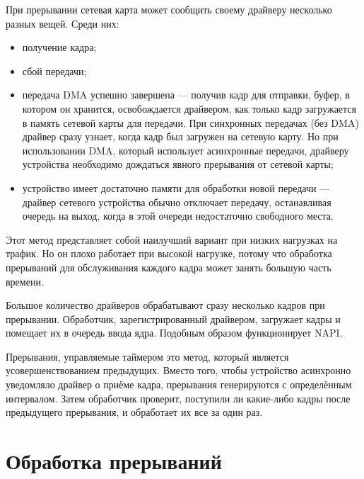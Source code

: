 При прерывании сетевая карта может сообщить своему драйверу несколько разных вещей. Среди них:
\begin{itemize}[label=---]
	\item получение кадра;
	\item сбой передачи;
	\item передача DMA успешно завершена --- получив кадр для отправки, буфер, в котором он хранится, освобождается драйвером, как только кадр загружается в память сетевой карты для передачи. При синхронных передачах (без DMA) драйвер сразу узнает, когда кадр был загружен на сетевую карту. Но при использовании DMA, который использует асинхронные передачи, драйверу устройства необходимо дождаться явного прерывания от сетевой карты;
	\item устройство имеет достаточно памяти для обработки новой передачи --- драйвер сетевого устройства обычно отключает передачу, останавливая очередь на выход, когда в этой очереди недостаточно свободного места.
\end{itemize}

Этот метод представляет собой наилучший вариант при низких нагрузках на трафик. Но он плохо работает при высокой нагрузке, потому что обработка прерываний для обслуживания каждого кадра может занять большую часть времени.

Большое количество драйверов обрабатывают сразу несколько кадров при прерывании. Обработчик, зарегистрированный драйвером, загружает кадры и помещает их в очередь ввода ядра. Подобным образом функционирует NAPI.

Прерывания, управляемые таймером это метод, который является усовершенствованием предыдущих. Вместо того, чтобы устройство асинхронно уведомляло драйвер о приёме кадра, прерывания генерируются с определённым интервалом. Затем обработчик проверит, поступили ли какие-либо кадры после предыдущего прерывания, и обработает их все за один раз.

\section{Обработка прерываний}

